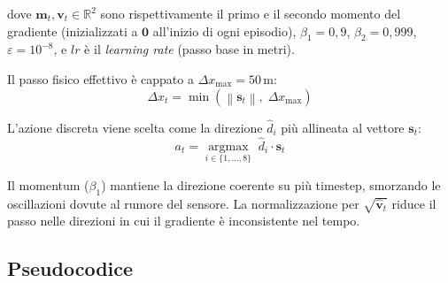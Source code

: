 \documentclass[12pt, a4paper]{article}
\begin{document}
dove $\mathbf{m}_t, \mathbf{v}_t \in \mathbb{R}^2$ sono rispettivamente il primo e il secondo
momento del gradiente (inizializzati a $\mathbf{0}$ all'inizio di ogni episodio),
$\beta_1 = 0{,}9$, $\beta_2 = 0{,}999$, $\varepsilon = 10^{-8}$, e $lr$ \`e il
\emph{learning rate} (passo base in metri).

Il passo fisico effettivo \`e cappato a $\Delta x_{\max} = 50\,\text{m}$:
\begin{equation}
    \Delta x_t = \min\!\left(\left\|\mathbf{s}_t\right\|,\; \Delta x_{\max}\right)
\end{equation}

L'azione discreta viene scelta come la direzione $\hat{d}_i$ pi\`u allineata al vettore
$\mathbf{s}_t$:
\begin{equation}
    a_t = \operatorname*{argmax}_{i \in \{1,\ldots,8\}} \; \hat{d}_i \cdot \mathbf{s}_t
\end{equation}

Il momentum ($\beta_1$) mantiene la direzione coerente su pi\`u timestep, smorzando le
oscillazioni dovute al rumore del sensore. La normalizzazione per $\sqrt{\hat{\mathbf{v}}_t}$
riduce il passo nelle direzioni in cui il gradiente \`e inconsistente nel tempo.

\subsection{Pseudocodice}
\end{document}
